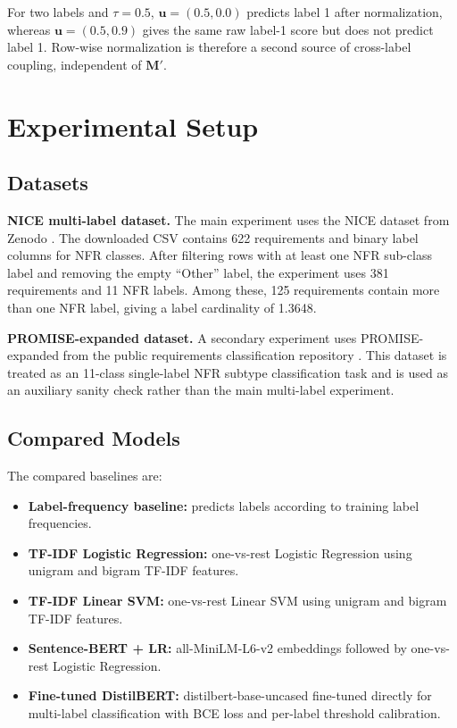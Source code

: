 \documentclass[runningheads]{llncs}
\begin{document}
\begin{remark}
For two labels and $\tau=0.5$, $\mathbf{u}=(0.5,0.0)$ predicts label 1 after
normalization, whereas $\mathbf{u}=(0.5,0.9)$ gives the same raw label-1 score
but does not predict label 1. Row-wise normalization is therefore a second
source of cross-label coupling, independent of $\mathbf{M}'$.
\end{remark}

\section{Experimental Setup}
\subsection{Datasets}
\textbf{NICE multi-label dataset.} The main experiment uses the NICE dataset
from Zenodo \cite{nice_dataset}. The downloaded CSV contains 622 requirements
and binary label columns for NFR classes. After filtering rows with at least one
NFR sub-class label and removing the empty ``Other'' label, the experiment uses
381 requirements and 11 NFR labels. Among these, 125 requirements contain more
than one NFR label, giving a label cardinality of 1.3648.

\textbf{PROMISE-expanded dataset.} A secondary experiment uses
PROMISE-expanded from the public requirements classification repository
\cite{mitrevski_promise_exp}. This dataset is treated as an 11-class
single-label NFR subtype classification task and is used as an auxiliary sanity
check rather than the main multi-label experiment.

\subsection{Compared Models}
The compared baselines are:
\begin{itemize}
    \item \textbf{Label-frequency baseline:} predicts labels according to training label frequencies.
    \item \textbf{TF-IDF Logistic Regression:} one-vs-rest Logistic Regression using unigram and bigram TF-IDF features.
    \item \textbf{TF-IDF Linear SVM:} one-vs-rest Linear SVM using unigram and bigram TF-IDF features.
    \item \textbf{Sentence-BERT + LR:} all-MiniLM-L6-v2 embeddings followed by one-vs-rest Logistic Regression.
    \item \textbf{Fine-tuned DistilBERT:} distilbert-base-uncased fine-tuned directly for multi-label classification with BCE loss and per-label threshold calibration.
\end{itemize}
\end{document}
